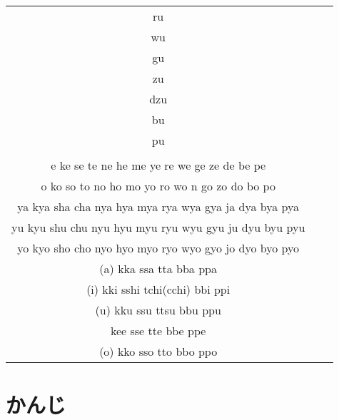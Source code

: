 \documentclass{article}
\begin{document}
\begin{CJK}{UTF8}{min}
\begin{tabular}{c|c|c}
ru\\
wu\\
gu\\
zu\\
dzu\\
bu\\
pu\\\\
e
ke
se
te
ne
he
me
ye
re
we
ge
ze
de
be
pe\\
o
 ko
so
 to
 no
 ho
mo
yo
ro
wo
n
go
zo
do
bo
po\\
ya
kya
sha
cha
nya
hya
mya
rya
wya
gya
ja
dya
bya
pya\\
yu
kyu
shu
chu
nyu
hyu
myu
ryu
wyu
gyu
ju
dyu
byu
pyu\\
yo
kyo
sho
cho
nyo
hyo
myo
ryo
wyo
gyo
jo
dyo
byo
pyo\\
(a)
kka
ssa
tta
bba
ppa\\
(i)
kki
sshi
tchi(cchi)
bbi
ppi\\
(u)
kku
ssu
ttsu
bbu
ppu\\
kee
sse
tte
bbe
ppe\\
(o)
kko
sso
tto
bbo
ppo\\


\end{tabular}
\section{}
\section{かんじ}

\end{CJK}
\end{document}

